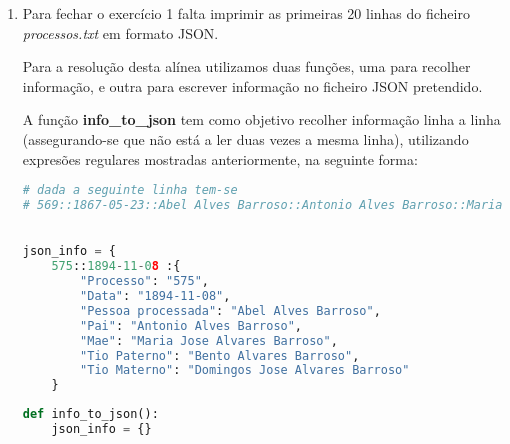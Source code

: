 \documentclass[11pt,a4paper]{report}
\begin{document}
\begin{enumerate}[label=\alph*.]
        \begin{lstlisting}[language=Python]
def relationFrequency():
    rel_freq = {}
    rel_freq["Progenitores"] = 0
    rel_freq["Filho"] = 0

    for line in lines:
        parents_and_son = re.findall(":([A-Za-z| ]+):", line)
    
        if parents_and_son:
            parents = parents_and_son[1:]
            rel_freq["Filho"] += 1
            rel_freq["Progenitores"] += len(parents)

        relations = re.findall("([A-Z][A-Za-z ]+),([A-Za-z ]+). ?(?i:(Proc.[0-9]+))", line)
        if relations:
            for relation in relations:
                if relation[1] not in rel_freq:
                    rel_freq[relation[1]] = 1
                else:
                    rel_freq[relation[1]] += 1

    return rel_freq
        \end{lstlisting}
    

    \item Para fechar o exercício 1 falta imprimir as primeiras 20 linhas do ficheiro \textit{processos.txt} em formato JSON.
    
    Para a resolução desta alínea utilizamos duas funções, uma para recolher informação, e outra para escrever informação no ficheiro JSON pretendido.

    A função \textbf{info\_to\_json} tem como objetivo recolher informação linha a linha (assegurando-se que não está a ler duas vezes a mesma linha), utilizando expresões regulares mostradas anteriormente, na seguinte forma:

        \begin{lstlisting}[language=Python]
# dada a seguinte linha tem-se
# 569::1867-05-23::Abel Alves Barroso::Antonio Alves Barroso::Maria Jose Alvares Barroso::Bento Alvares Barroso,Tio Paterno. Proc.32057.   Domingos Jose Alvares Barroso,Tio Materno. Proc.32235.::

    
json_info = { 
    575::1894-11-08 :{
        "Processo": "575",
        "Data": "1894-11-08",
        "Pessoa processada": "Abel Alves Barroso",
        "Pai": "Antonio Alves Barroso",
        "Mae": "Maria Jose Alvares Barroso",
        "Tio Paterno": "Bento Alvares Barroso",
        "Tio Materno": "Domingos Jose Alvares Barroso"
    }
        \end{lstlisting}

        \begin{lstlisting}[language=Python]
def info_to_json():
    json_info = {}


\end{lstlisting}
\end{enumerate}
\end{document}

